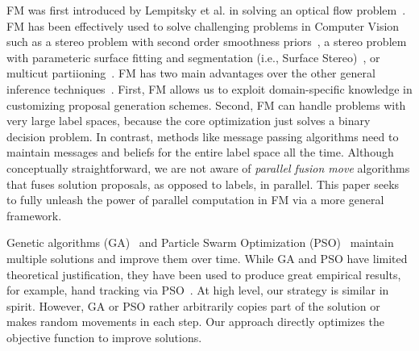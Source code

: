 \noindent FM was first introduced by Lempitsky et al. in solving an
optical flow problem~\cite{first_fusion_viktor}. FM has been effectively
used to solve challenging problems in Computer Vision such as a stereo
problem with second order smoothness priors~\cite{woodford}, a stereo
problem with parameteric surface fitting and segmentation (i.e., Surface
Stereo)~\cite{surface_stereo}, or multicut
partiioning~\cite{fusionmovesforcorrelationclustering}.
%
FM has two main advantages over the other general inference
techniques~\cite{trw,loopy_belief_propagation}.  First, FM allows us to exploit
domain-specific knowledge in customizing proposal generation
schemes. Second, FM can handle problems with very large label spaces,
because the core optimization just solves a binary decision problem. In
contrast, methods like message passing algorithms need to maintain
messages and beliefs for the entire label space all the time. 
%
Although conceptually straightforward, we are not aware of {\it parallel
fusion move} algorithms that fuses solution proposals, as opposed to
labels, in parallel. This paper seeks to fully unleash the power of
parallel computation in FM via a more general framework.



\noindent
Genetic algorithms (GA)~\cite{ga} and Particle Swarm
Optimization (PSO)~\cite{pso} maintain multiple solutions and improve
them over time.
%
While GA and PSO have limited theoretical justification, they have been
used to produce great empirical results, for example, hand tracking via
PSO~\cite{pushmeet_hand_tracking}. At high level, our strategy is
similar in spirit. However, GA or PSO rather arbitrarily copies part of
the solution or makes random movements in each step. Our approach
directly optimizes the objective function to improve solutions.


